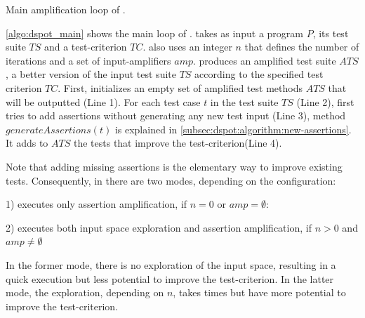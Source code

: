 \begin{algorithm}
	\caption{Main amplification loop of \dspot.}
	\label{algo:dspot_main}
	\begin{algorithmic}[1]
		\EndFor
		\EndFor
		\EndFor
	\end{algorithmic}
\end{algorithm}

\autoref{algo:dspot_main} shows the main loop of \dspot. 
\dspot takes as input a program $P$, its test suite $TS$ and a test-criterion $TC$. 
\dspot also uses an integer $n$ that defines the number of iterations and a set of input-amplifiers $amp$.
\dspot produces an amplified test suite $ATS$, \ie a better version of the input test suite $TS$ according to the specified test criterion $TC$.
First, \dspot initializes an empty set of amplified test methods $ATS$ that will be outputted (Line 1).
For each test case $t$ in the test suite $TS$ (Line 2), 
\dspot first tries to add assertions without generating any new test input (Line 3), method $generateAssertions\left(t\right)$ is explained in \autoref{subsec:dspot:algorithm:new-assertions}.
It adds to $ATS$ the tests that improve the test-criterion(Line 4).

Note that adding missing assertions is the elementary way to improve existing tests.
Consequently, in \dspot there are two modes, depending on the configuration:

1) \dspot executes only assertion amplification, if $n = 0$ or $amp = \emptyset $:

2) \dspot executes both input space exploration and assertion amplification, if $n > 0$ and $amp \ne \emptyset$

In the former mode, there is no exploration of the input space, resulting in a quick execution but less potential to improve the test-criterion.
In the latter mode, the exploration, depending on $n$, takes times but have more potential to improve the test-criterion.

